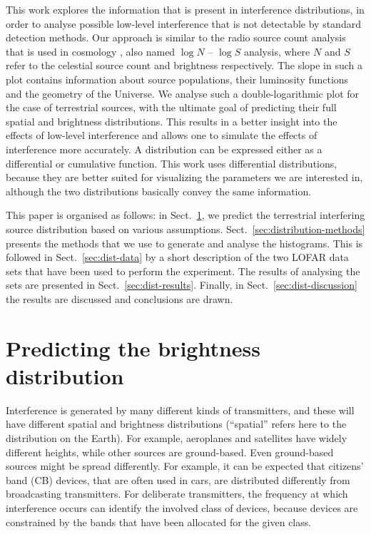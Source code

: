 \documentclass[useAMS,usenatbib]{mn2e}
\begin{document}
This work explores the information that is present in interference distributions, in order to analyse possible low-level interference that is not detectable by standard detection methods. Our approach is similar to the radio source count analysis that is used in cosmology \citep{condon-cosm-evol-of-radio-sources}, also named $\log N$ -- $\log S$ analysis, where $N$ and $S$ refer to the celestial source count and brightness respectively. The slope in such a plot contains information about source populations, their luminosity functions and the geometry of the Universe. We analyse such a double-logarithmic plot for the case of terrestrial sources, with the ultimate goal of predicting their full spatial and brightness distributions. This results in a better insight into the effects of low-level interference and allows one to simulate the effects of interference more accurately. A distribution can be expressed either as a differential or cumulative function. This work uses differential distributions, because they are better suited for visualizing the parameters we are interested in, although the two distributions basically convey the same information.


This paper is organised as follows: in Sect.~\ref{sec:distribution-prediction}, we predict the terrestrial interfering source distribution based on various assumptions. Sect.~\ref{sec:distribution-methods} presents the methods that we use to generate and analyse the histograms. This is followed in Sect.~\ref{sec:dist-data} by a short description of the two LOFAR data sets that have been used to perform the experiment. The results of analysing the sets are presented in Sect.~\ref{sec:dist-results}. Finally, in Sect.~\ref{sec:dist-discussion} the results are discussed and conclusions are drawn.

\section{Predicting the brightness distribution} \label{sec:distribution-prediction}
Interference is generated by many different kinds of transmitters, and these will have different spatial and brightness distributions (``spatial'' refers here to the distribution on the Earth). For example, aeroplanes and satellites have widely different heights, while other sources are ground-based. Even ground-based sources might be spread differently. For example, it can be expected that citizens' band (CB) devices, that are often used in cars, are distributed differently from broadcasting transmitters. For deliberate transmitters, the frequency at which interference occurs can identify the involved class of devices, because devices are constrained by the bands that have been allocated for the given class.
\end{document}

